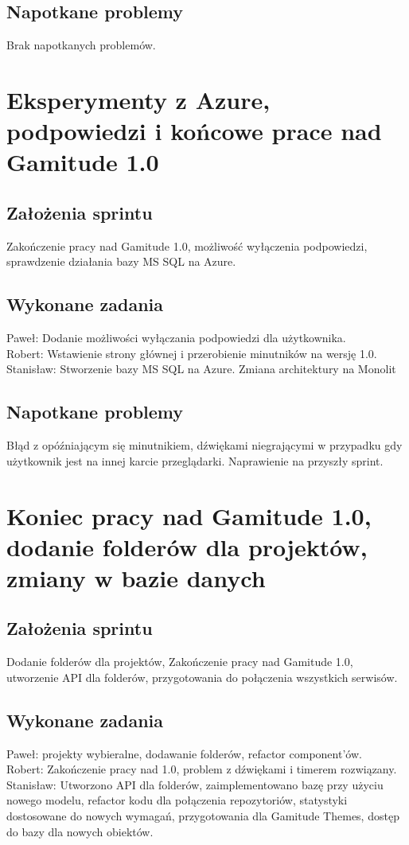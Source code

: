 \documentclass[a4paper,11pt]{report}
\begin{document}
\subsection {Napotkane problemy}
Brak napotkanych problemów.

\section {Eksperymenty z Azure, podpowiedzi i końcowe prace nad Gamitude 1.0}
\subsection {Założenia sprintu}
Zakończenie pracy nad Gamitude 1.0, możliwość wyłączenia podpowiedzi, sprawdzenie działania bazy MS SQL na Azure.
\subsection {Wykonane zadania}
Paweł: Dodanie możliwości wyłączania podpowiedzi dla użytkownika.\\ 
Robert: Wstawienie strony głównej i przerobienie minutników na wersję 1.0. \\
Stanisław: Stworzenie bazy MS SQL na Azure. Zmiana architektury na Monolit \\
\subsection {Napotkane problemy}
Błąd z opóźniającym się minutnikiem, dźwiękami niegrającymi w przypadku gdy użytkownik jest na innej karcie przeglądarki. Naprawienie na przyszły sprint.

\section {Koniec pracy nad Gamitude 1.0, dodanie folderów dla projektów, zmiany w bazie danych}
\subsection {Założenia sprintu}
Dodanie folderów dla projektów, Zakończenie pracy nad Gamitude 1.0, utworzenie API dla folderów, przygotowania do połączenia wszystkich serwisów.
\subsection {Wykonane zadania}
Paweł: projekty wybieralne, dodawanie folderów, refactor component'ów.\\ 
Robert: Zakończenie pracy nad 1.0, problem z dźwiękami i timerem rozwiązany.\\
Stanisław: Utworzono API dla folderów, zaimplementowano bazę przy użyciu nowego modelu, refactor kodu dla połączenia repozytoriów, statystyki dostosowane do nowych wymagań, przygotowania dla Gamitude Themes, dostęp do bazy dla nowych obiektów. \\
\end{document}

